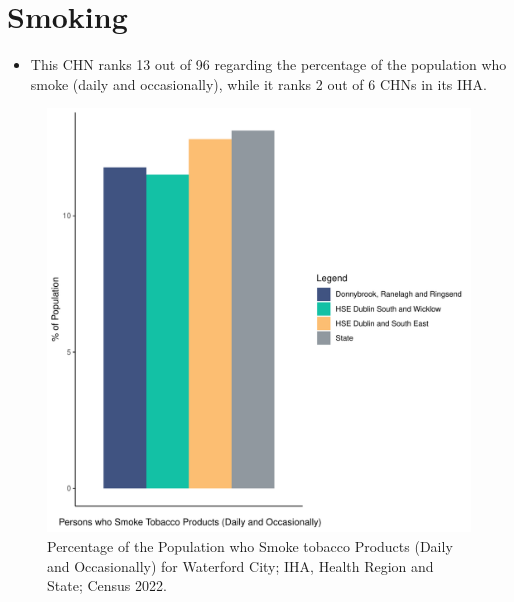 \documentclass{article}
\begin{document}
\pagebreak

\section{Smoking}\label{sect:Smoking}
\begin{itemize}
\item This CHN ranks  13 out of 96 regarding the percentage of the population who smoke (daily and occasionally), while it ranks   2 out of 6 CHNs in its IHA.
\end{itemize}
\begin{figure}[H]
	\centering
	\includegraphics[width = 120mm]{../figures/SmokingED.pdf}
	\caption{Percentage of the Population who Smoke tobacco Products (Daily and Occasionally) for Waterford City; IHA, Health Region and State; Census 2022.}
	\label{fig:2ae19629-1a6a-13a3-e055-000000000001}
	\end{figure}
	
\end{document}
